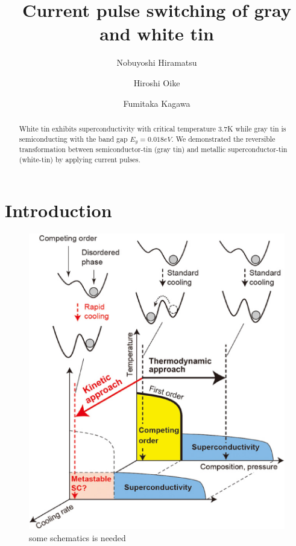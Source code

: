 \documentclass[aip,apl,reprint]{revtex4-1}
\begin{document}

\title{Current pulse switching of gray and white tin} 
\author{Nobuyoshi Hiramatsu}
\author{Hiroshi Oike}
\author{Fumitaka Kagawa}

\begin{abstract}
White tin exhibits superconductivity with critical temperature 3.7K while gray tin is semiconducting with the band gap $E_g=0.018eV$.
We demonstrated the reversible transformation between semiconductor-tin (gray tin) and metallic superconductor-tin (white-tin) by applying current pulses.
\end{abstract}

\maketitle 
\section{Introduction}

\begin{figure}[!h]
    \begin{center}
   \includegraphics[width=0.9\hsize]{kinetic_approach.eps}
  \end{center}
  \caption{some schematics is needed}
  \label{fig:kinetic_approach.eps}
\end{figure}
\end{document}
